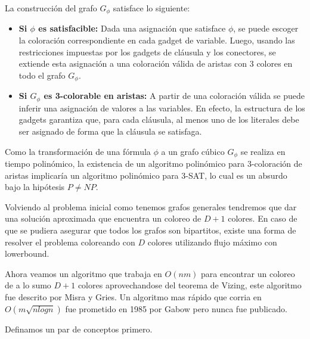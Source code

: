 \documentclass[a4paper]{article}
\begin{document}
La construcción del grafo $G_\phi$ satisface lo siguiente:
\begin{itemize}
    \item \textbf{Si $\phi$ es satisfacible:}  
    Dada una asignación que satisface $\phi$, se puede escoger la coloración correspondiente en cada gadget de variable. Luego, usando las restricciones impuestas por los gadgets de cláusula y los conectores, se extiende esta asignación a una coloración válida de aristas con 3 colores en todo el grafo $G_\phi$.
    
    \item \textbf{Si $G_\phi$ es 3-colorable en aristas:}  
    A partir de una coloración válida se puede inferir una asignación de valores a las variables. En efecto, la estructura de los gadgets garantiza que, para cada cláusula, al menos uno de los literales debe ser asignado de forma que la cláusula se satisfaga.
\end{itemize}

Como la transformación de una fórmula $\phi$ a un grafo cúbico $G_\phi$ se realiza en tiempo polinómico, la existencia de un algoritmo polinómico para 3-coloración de aristas implicaría un algoritmo polinómico para 3-SAT, lo cual es un absurdo bajo la hipótesis \(P \neq NP\).

Volviendo al problema inicial como tenemos grafos generales tendremos que dar una soluci\'on aproximada que encuentra un coloreo de $D+1$ colores. En caso de que se pudiera asegurar que todos los grafos son bipartitos, existe una forma de resolver el problema coloreando con $D$ colores utilizando flujo m\'aximo con lowerbound.

Ahora veamos un algoritmo que trabaja en $O(nm)$ para encontrar un coloreo de a lo sumo $D+1$ colores aprovechandose del teorema de Vizing, este algoritmo fue descrito por Misra y Gries. Un algoritmo mas r\'apido que
corria en $O(m\sqrt{nlogn})$ fue prometido en 1985 por Gabow pero nunca fue publicado.

Definamos un par de conceptos primero.
\end{document}
